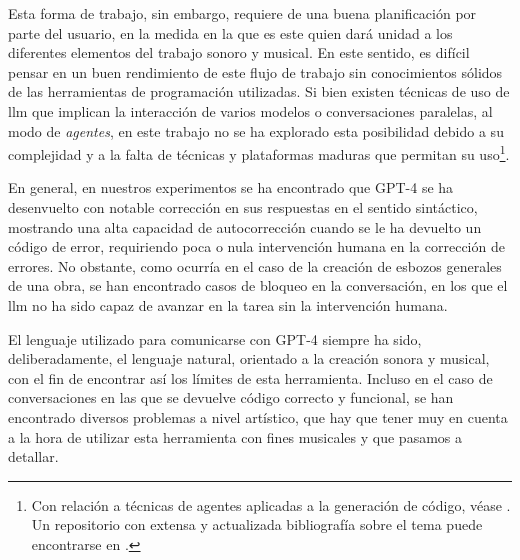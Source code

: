 Esta forma de trabajo, sin embargo, requiere de una buena planificación por parte del usuario, en la medida en la que es este quien dará unidad a los diferentes elementos del trabajo sonoro y musical. En este sentido, es difícil pensar en un buen rendimiento de este flujo de trabajo sin conocimientos sólidos de las herramientas de programación utilizadas. Si bien existen técnicas de uso de \gls{llm} que implican la interacción de varios modelos o conversaciones paralelas, al modo de \emph{agentes}, en este trabajo no se ha explorado esta posibilidad debido a su complejidad y a la falta de técnicas y plataformas maduras que permitan su uso\footnote{Con relación a técnicas de agentes aplicadas a la generación de código, véase \cite{huangAgentCoderMultiAgentbasedCode2023}. Un repositorio con extensa y actualizada bibliografía sobre el tema puede encontrarse en \cite{AGIEdgerunnersLLMAgentsPapers2024}.}.

En general, en nuestros experimentos se ha encontrado que GPT-4 se ha desenvuelto con notable corrección en sus respuestas en el sentido sintáctico, mostrando una alta capacidad de autocorrección cuando se le ha devuelto un código de error, requiriendo poca o nula intervención humana en la corrección de errores. No obstante, como ocurría en el caso de la creación de esbozos generales de una obra, se han encontrado casos de bloqueo en la conversación, en los que el \gls{llm} no ha sido capaz de avanzar en la tarea sin la intervención humana. 

El lenguaje utilizado para comunicarse con GPT-4 siempre ha sido, deliberadamente, el lenguaje natural, orientado a la creación sonora y musical, con el fin de encontrar así los límites de esta herramienta. Incluso en el caso de conversaciones en las que se devuelve código correcto y funcional, se han encontrado diversos problemas a nivel artístico, que hay que tener muy en cuenta a la hora de utilizar esta herramienta con fines musicales y que pasamos a detallar.


